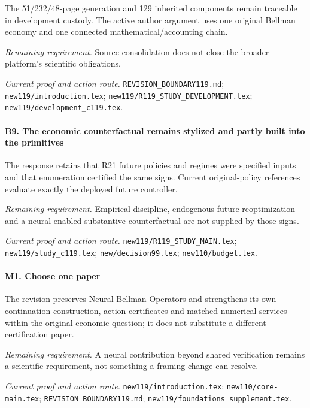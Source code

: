 The 51/232/48-page generation and 129 inherited components remain traceable in development custody. The active author argument uses one original Bellman economy and one connected mathematical/\allowbreak{}accounting chain.

\par\emph{Remaining requirement.} Source consolidation does not close the broader platform's scientific obligations.

\par\emph{Current proof and action route.} \nolinkurl{REVISION_BOUNDARY119.md}; \nolinkurl{new119/introduction.tex}; \nolinkurl{new119/R119_STUDY_DEVELOPMENT.tex}; \nolinkurl{new119/development_c119.tex}.

\paragraph{B9. The economic counterfactual remains stylized and partly built into the primitives}

The response retains that R21 future policies and regimes were specified inputs and that enumeration certified the same signs. Current original-policy references evaluate exactly the deployed future controller.

\par\emph{Remaining requirement.} Empirical discipline, endogenous future reoptimization and a neural-enabled substantive counterfactual are not supplied by those signs.

\par\emph{Current proof and action route.} \nolinkurl{new119/R119_STUDY_MAIN.tex}; \nolinkurl{new119/study_c119.tex}; \nolinkurl{new/decision99.tex}; \nolinkurl{new110/budget.tex}.

\paragraph{M1. Choose one paper}

The revision preserves Neural Bellman Operators and strengthens its own-continuation construction, action certificates and matched numerical services within the original economic question; it does not substitute a different certification paper.

\par\emph{Remaining requirement.} A neural contribution beyond shared verification remains a scientific requirement, not something a framing change can resolve.

\par\emph{Current proof and action route.} \nolinkurl{new119/introduction.tex}; \nolinkurl{new110/core-main.tex}; \nolinkurl{REVISION_BOUNDARY119.md}; \nolinkurl{new119/foundations_supplement.tex}.

